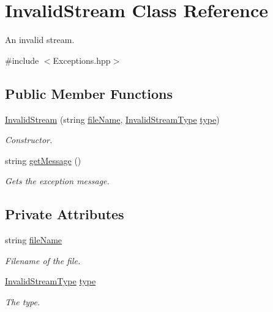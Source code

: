 \hypertarget{class_invalid_stream}{}\section{Invalid\+Stream Class Reference}
\label{class_invalid_stream}


An invalid stream.  




{\ttfamily \#include $<$Exceptions.\+hpp$>$}

\subsection*{Public Member Functions}
\begin{DoxyCompactItemize}
\item 
\hyperlink{class_invalid_stream_ab1b3ef87fa02f66bd2709efd48ad3928}{Invalid\+Stream} (string \hyperlink{class_invalid_stream_abec03af0cdc07c0e52aa7a1daadd438c}{file\+Name}, \hyperlink{_exceptions_8hpp_a20debbce0a9d256d07eac93067032a39}{Invalid\+Stream\+Type} \hyperlink{class_invalid_stream_af18ab97f0a3db6cc76716b1bd7808832}{type})
\begin{DoxyCompactList}\small\item\em Constructor. \end{DoxyCompactList}\item 
string \hyperlink{class_invalid_stream_a8aa15b0bc9caa1a31b15cfcbebaad67b}{get\+Message} ()
\begin{DoxyCompactList}\small\item\em Gets the exception message. \end{DoxyCompactList}\end{DoxyCompactItemize}
\subsection*{Private Attributes}
\begin{DoxyCompactItemize}
\item 
string \hyperlink{class_invalid_stream_abec03af0cdc07c0e52aa7a1daadd438c}{file\+Name}
\begin{DoxyCompactList}\small\item\em Filename of the file. \end{DoxyCompactList}\item 
\hyperlink{_exceptions_8hpp_a20debbce0a9d256d07eac93067032a39}{Invalid\+Stream\+Type} \hyperlink{class_invalid_stream_af18ab97f0a3db6cc76716b1bd7808832}{type}
\begin{DoxyCompactList}\small\item\em The type. \end{DoxyCompactList}\end{DoxyCompactItemize}


